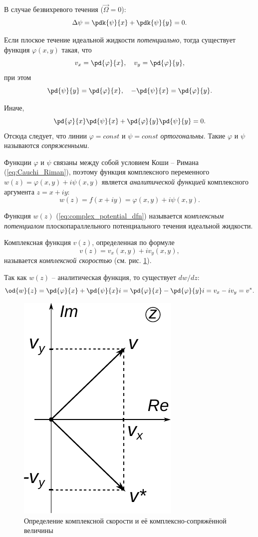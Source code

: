 \documentclass[a4paper, 14pt]{extarticle}
\begin{document}
В случае безвихревого течения ($\vec{\Omega} = 0$):
\[
	\Delta \psi = \pdk{\psi}{x} + \pdk{\psi}{y} = 0.
\]


Если плоское течение идеальной жидкости \textit{потенциально}, тогда существует функция $\varphi(x,y)$ такая, что
\[
	v_x = \pd{\varphi}{x},\quad
	v_y = \pd{\varphi}{y}, 
\]
при этом
\begin{equation}
	\label{eq:Cauchi_Riman}
	\pd{\psi}{y} = \pd{\varphi}{x},\quad
	-\pd{\psi}{x} = \pd{\varphi}{y}.
\end{equation}
	
Иначе,
\[
\pd{\varphi}{x}\pd{\psi}{x} + \pd{\varphi}{y}\pd{\psi}{y} = 0.
\]
Отсюда следует, что линии $\varphi=const$ и $\psi=const$ \textit{ортогональны}. Такие $\varphi$ и $\psi$ называются \textit{сопряженными}.
		
	
Функции $\varphi$ и $\psi$ связаны между собой условием Коши -- Римана (\ref{eq:Cauchi_Riman}), поэтому функция комплексного переменного $w(z) = \varphi(x,y) + i \psi(x,y)$ является \textit{аналитической функцией} комплексного аргумента $z = x + i y$:
\begin{equation}
	\label{eq:complex_potential_dfn}
	w(z) = f(x+iy) = \varphi(x,y) + i  \psi(x,y).
\end{equation}

\begin{dfn}
	Функция $w(z)$ (\ref{eq:complex_potential_dfn}) называется \textit{комплексным потенциалом} плоскопараллельного потенциального течения идеальной жидкости.
\end{dfn}			
		
		
\begin{dfn}
	Комплексная функция $v(z)$, определенная по формуле
	\[
	v(z) = v_x(x,y) + i v_y(x,y),
	\] 
	называется  \textit{комплексной скоростью} (см. рис. \ref{fig:v_complex_dfn}).
\end{dfn}

Так как $w(z)$ -- аналитическая функция, то существует $dw/dz$:
\[
\od{w}{z} = \pd{\varphi}{x}+\pd{\psi}{x} i = 
\pd{\varphi}{x}-\pd{\varphi}{y} i = v_x-i v_y = v^*. 
\]

\begin{figure}
	\centering
	\includegraphics[width=0.3\linewidth]{../img/v_star.pdf}
	\caption{Определение комплексной скорости и её комплексно-сопряжённой величины}
	\label{fig:v_complex_dfn}
\end{figure}
					
\end{document}

